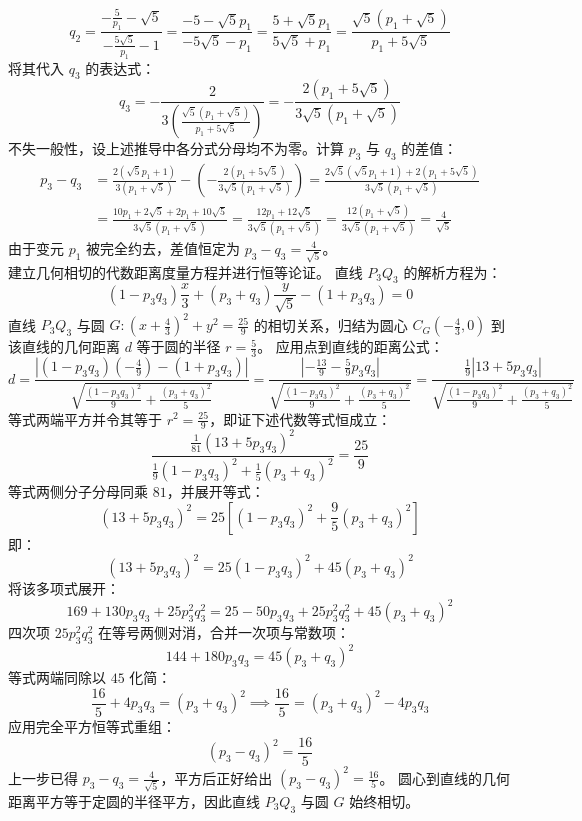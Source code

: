 \begin{solution}
\[ q_2 = \frac{-\frac{5}{p_1} - \sqrt{5}}{-\frac{5\sqrt{5}}{p_1} - 1} = \frac{-5 - \sqrt{5}p_1}{-5\sqrt{5} - p_1} = \frac{5 + \sqrt{5}p_1}{5\sqrt{5} + p_1} = \frac{\sqrt{5}(p_1 + \sqrt{5})}{p_1 + 5\sqrt{5}} \]
将其代入 $q_3$ 的表达式：
\[ q_3 = -\frac{2}{3 \left( \frac{\sqrt{5}(p_1 + \sqrt{5})}{p_1 + 5\sqrt{5}} \right)} = -\frac{2(p_1 + 5\sqrt{5})}{3\sqrt{5}(p_1 + \sqrt{5})} \]
不失一般性，设上述推导中各分式分母均不为零。计算 $p_3$ 与 $q_3$ 的差值：
\begin{align*}
p_3 - q_3 &= \frac{2(\sqrt{5}p_1 + 1)}{3(p_1 + \sqrt{5})} - \left( -\frac{2(p_1 + 5\sqrt{5})}{3\sqrt{5}(p_1 + \sqrt{5})} \right) = \frac{2\sqrt{5}(\sqrt{5}p_1 + 1) + 2(p_1 + 5\sqrt{5})}{3\sqrt{5}(p_1 + \sqrt{5})} \\
&= \frac{10p_1 + 2\sqrt{5} + 2p_1 + 10\sqrt{5}}{3\sqrt{5}(p_1 + \sqrt{5})} = \frac{12p_1 + 12\sqrt{5}}{3\sqrt{5}(p_1 + \sqrt{5})} = \frac{12(p_1 + \sqrt{5})}{3\sqrt{5}(p_1 + \sqrt{5})} = \frac{4}{\sqrt{5}}
\end{align*}
由于变元 $p_1$ 被完全约去，差值恒定为 $p_3 - q_3 = \frac{4}{\sqrt{5}}$。\\
建立几何相切的代数距离度量方程并进行恒等论证。
直线 $P_3Q_3$ 的解析方程为：
\[ (1 - p_3 q_3)\frac{x}{3} + (p_3 + q_3)\frac{y}{\sqrt{5}} - (1 + p_3 q_3) = 0 \]
直线 $P_3Q_3$ 与圆 $G: \left(x + \frac{4}{3}\right)^2 + y^2 = \frac{25}{9}$ 的相切关系，归结为圆心 $C_G\left(-\frac{4}{3}, 0\right)$ 到该直线的几何距离 $d$ 等于圆的半径 $r = \frac{5}{3}$。
应用点到直线的距离公式：
\[ d = \frac{\left| (1 - p_3 q_3)\left(-\frac{4}{9}\right) - (1 + p_3 q_3) \right|}{\sqrt{\frac{(1 - p_3 q_3)^2}{9} + \frac{(p_3 + q_3)^2}{5}}} = \frac{\left| -\frac{13}{9} - \frac{5}{9}p_3 q_3 \right|}{\sqrt{\frac{(1 - p_3 q_3)^2}{9} + \frac{(p_3 + q_3)^2}{5}}} = \frac{\frac{1}{9}|13 + 5p_3 q_3|}{\sqrt{\frac{(1 - p_3 q_3)^2}{9} + \frac{(p_3 + q_3)^2}{5}}} \]
等式两端平方并令其等于 $r^2 = \frac{25}{9}$，即证下述代数等式恒成立：
\[ \frac{\frac{1}{81}(13 + 5p_3 q_3)^2}{\frac{1}{9}(1 - p_3 q_3)^2 + \frac{1}{5}(p_3 + q_3)^2} = \frac{25}{9} \]
等式两侧分子分母同乘 $81$，并展开等式：
\[ (13 + 5p_3 q_3)^2 = 25 \left[ (1 - p_3 q_3)^2 + \frac{9}{5}(p_3 + q_3)^2 \right] \]
即：
\[ (13 + 5p_3 q_3)^2 = 25(1 - p_3 q_3)^2 + 45(p_3 + q_3)^2 \]
将该多项式展开：
\[ 169 + 130p_3 q_3 + 25p_3^2 q_3^2 = 25 - 50p_3 q_3 + 25p_3^2 q_3^2 + 45(p_3 + q_3)^2 \]
四次项 $25p_3^2 q_3^2$ 在等号两侧对消，合并一次项与常数项：
\[ 144 + 180p_3 q_3 = 45(p_3 + q_3)^2 \]
等式两端同除以 $45$ 化简：
\[ \frac{16}{5} + 4p_3 q_3 = (p_3 + q_3)^2 \implies \frac{16}{5} = (p_3 + q_3)^2 - 4p_3 q_3 \]
应用完全平方恒等式重组：
\[ (p_3 - q_3)^2 = \frac{16}{5} \]
上一步已得 $p_3 - q_3 = \frac{4}{\sqrt{5}}$，平方后正好给出 $(p_3 - q_3)^2 = \frac{16}{5}$。
圆心到直线的几何距离平方等于定圆的半径平方，因此直线 $P_3Q_3$ 与圆 $G$ 始终相切。
\end{solution}


